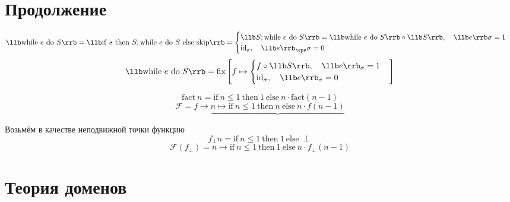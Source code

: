 \section{Продолжение}

$$ \llb \mathrm{while}~e~\mathrm{do}~S \rrb =
\llb \mathrm{if}~e~\mathrm{then}~S; \mathrm{while}~e~\mathrm{do}~S~\mathrm{else}~\mathrm{skip}
\rrb =
\begin{cases}
	\llb S; \mathrm{while}~e~\mathrm{do}~S \rrb =
	\llb \mathrm{while}~e~\mathrm{do}~S \rrb \circ \llb S \rrb, \quad \llb e \rrb \sigma = 1 \\
	\mathrm{id}_\sigma, \quad \llb e \rrb_\eps \sigma = 0
\end{cases} $$
$$ \llb \mathrm{while}~e~\mathrm{do}~S \rrb = \mathrm{fix} \left[ f \mapsto
	\begin{cases}
		f \circ \llb S \rrb, \quad \llb e \rrb_\sigma = 1 \\
		\mathrm{id}_\sigma, \quad \llb e \rrb_\sigma = 0
	\end{cases} \right] $$

$$ \mathrm{fact}~n = \mathrm{if}~n \le 1~\mathrm{then}~1~\mathrm{else}~n \cdot
\mathrm{fact}(n - 1) $$
$$ \mathcal F = f \mapsto \underbrace{n \mapsto \mathrm{if}~n \le 1~\mathrm{then}~n~\mathrm{else}~n
\cdot f(n - 1)} $$

Возьмём в качестве неподвижной точки функцию
$$ f_\perp n = \mathrm{if}~n \le 1~\mathrm{then}~1~\mathrm{else}~\perp $$
$$ \mathcal F(f_\perp) = n \mapsto \mathrm{if}~n \le 1~\mathrm{then}~1~\mathrm{else}~n
\cdot f_\perp(n - 1) $$

\section{Теория доменов}

